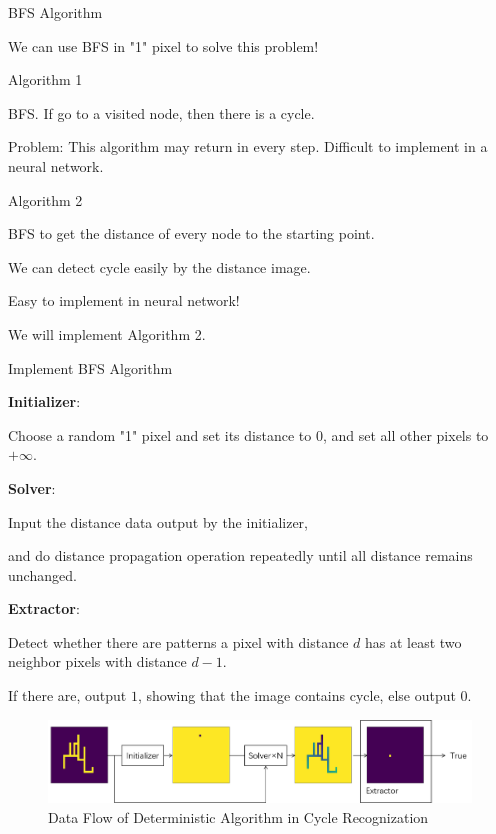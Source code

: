 \documentclass[serif]{beamer}
\begin{document}
\begin{frame}{BFS Algorithm}

	We can use BFS in "1" pixel to solve this problem!

	\begin{block}{Algorithm 1}

		BFS. If go to a visited node, then there is a cycle.

	\end{block}

	Problem: This algorithm may return in every step. Difficult to implement in a neural network.

	\begin{block}{Algorithm 2}

		BFS to get the distance of every node to the starting point.

		We can detect cycle easily by the distance image.

	\end{block}

	Easy to implement in neural network!

	We will implement Algorithm 2.


\end{frame}

\begin{frame}{Implement BFS Algorithm}

	\textbf{Initializer}:

	Choose a random "1" pixel and set its distance to $0$, and set all other pixels to $+\infty$.

	\textbf{Solver}:

	Input the distance data output by the initializer,

	and do distance propagation operation repeatedly until all distance remains unchanged.

	\textbf{Extractor}:

	Detect whether there are patterns a pixel with distance $d$ has at least two neighbor pixels with distance $d-1$.

	If there are, output $1$, showing that the image contains cycle, else output $0$.

\end{frame}

\begin{frame}

	\begin{figure}[H] %
		\centering %
		\includegraphics[width=1.0\textwidth]{../image/flow.png} %
		\caption{Data Flow of Deterministic Algorithm in Cycle Recognization} %
		\label{Fig.Flow} %
	\end{figure}

\end{frame}
\end{document}
